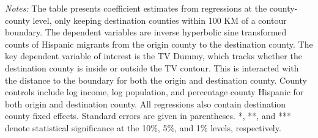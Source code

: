 \begin{table}[!h]
{\begin{threeparttable}
\begin{tablenotes}[flushleft]
				\item \textit{Notes:} The table presents coefficient estimates from regressions at the county-county level, only keeping destination counties within 100 KM of a contour boundary. The dependent variables are inverse hyperbolic sine transformed counts of Hispanic migrants from the origin county to the destination county. The key dependent variable of interest is the TV Dummy, which tracks whether the destination county is inside or outside the TV contour. This is interacted with the distance to the boundary for both the origin and destination county. County controls include log income, log population, and percentage county Hispanic for both origin and destination county. All regressions also contain destination county fixed effects. Standard errors are given in parentheses. *, **, and *** denote statistical significance at the 10\%, 5\%, and 1\% levels, respectively.
			\end{tablenotes}
		\end{threeparttable}
	}
\end{table}